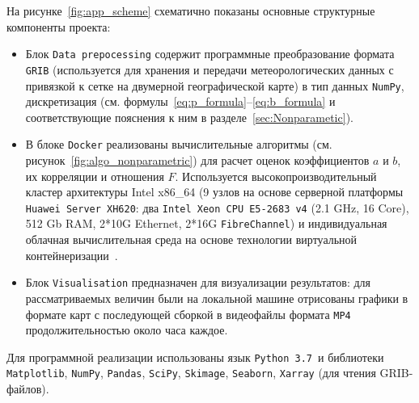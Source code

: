 На рисунке~\ref{fig:app_scheme} схематично показаны основные структурные компоненты проекта:
\begin{itemize}
	\item Блок \verb"Data prepocessing" содержит программные преобразование формата \verb"GRIB" (используется для хранения и передачи метеорологических данных с привязкой к сетке на двумерной географической карте) в тип данных \verb"NumPy", дискретизация (см. формулы~\eqref{eq:p_formula}--\eqref{eq:b_formula} и соответствующие пояснения к ним в разделе~\ref{sec:Nonparametic}).
	\item В блоке \verb"Docker" реализованы вычислительные алгоритмы (см. рисунок~\ref{fig:algo_nonparametric}) для расчет оценок коэффициентов $a$ и $b$, их корреляции и отношения $F$. Используется высокопроизводительный кластер архитектуры Intel x86\_64 (9 узлов на основе серверной платформы \verb"Huawei Server XH620": два \verb"Intel Xeon CPU E5-2683 v4" (2.1 GHz, 16 Core), 512 Gb RAM, 2*10G Ethernet, 2*16G \verb"FibreChannel") и индивидуальная облачная вычислительная среда на основе технологии виртуальной контейнеризации~\cite{peinl2016docker}.
	\item Блок \verb"Visualisation" предназначен для визуализации результатов: для рассматриваемых величин были на локальной машине отрисованы графики в формате карт с последующей сборкой в видеофайлы формата \verb"MP4" продолжительностью около часа каждое.
\end{itemize}

Для программной реализации использованы язык \verb"Python 3.7"\ и библиотеки \verb"Matplotlib", \verb"NumPy", \verb"Pandas", \verb"SciPy", \verb"Skimage", \verb"Seaborn", \verb"Xarray" (для чтения GRIB-файлов).







